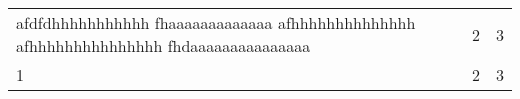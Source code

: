 \documentclass{article}
\begin{document}
\begin{tabularx}{\textwidth}{X X X}
afdfdhhhhhhhhhhh fhaaaaaaaaaaaaa afhhhhhhhhhhhhhh afhhhhhhhhhhhhhhh fhdaaaaaaaaaaaaaaa & 2 & 3\\
1 & 2 & 3\\
\end{tabularx}
\end{document}
